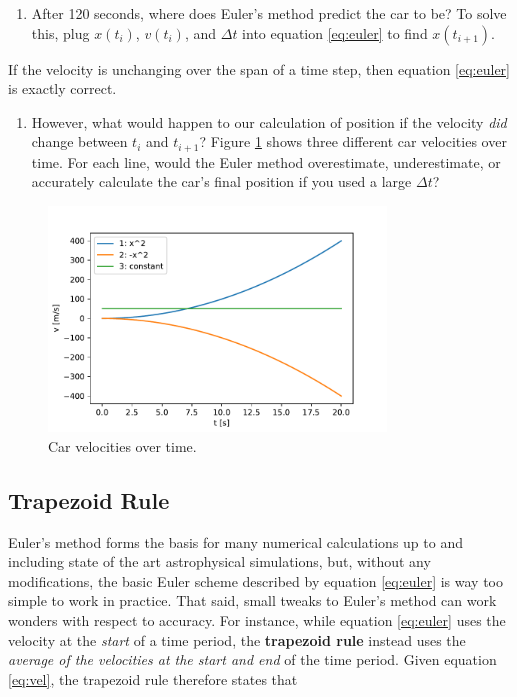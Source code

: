 \documentclass[11pt]{article}
\begin{document}
\begin{enumerate}[resume]
    \item After 120 seconds, where does Euler's method predict the car to be? To solve this, plug $x(t_i)$, $v(t_i)$, and $\Delta t$ into equation \ref{eq:euler} to find $x(t_{i+1})$.
\end{enumerate}

\medskip \noindent
If the velocity is unchanging over the span of a time step, then equation \ref{eq:euler} is exactly correct.
\begin{enumerate}[resume]
    \item However, what would happen to our calculation of position if the velocity \textit{did} change between $t_i$ and $t_{i+1}$? Figure \ref{fig:three_functions} shows three different car velocities over time. For each line, would the Euler method overestimate, underestimate, or accurately calculate the car's final position if you used a large $\Delta t$?
\end{enumerate}

\begin{figure}[t!]
    \centering
    \includegraphics[width=0.8\textwidth]{Images/three_functions.pdf}
    \caption{Car velocities over time.}
    \label{fig:three_functions}
\end{figure}

\subsection{Trapezoid Rule}
Euler's method forms the basis for many numerical calculations up to and including state of the art astrophysical simulations, but, without any modifications, the basic Euler scheme described by equation \ref{eq:euler} is way too simple to work in practice. That said, small tweaks to Euler's method can work wonders with respect to accuracy. For instance, while equation \ref{eq:euler} uses the velocity at the \emph{start} of a time period, the \textbf{trapezoid rule} instead uses the \emph{average of the velocities at the start and end} of the time period. Given equation \ref{eq:vel}, the trapezoid rule therefore states that
\end{document}
